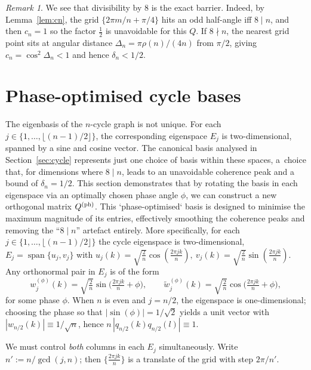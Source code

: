 \documentclass[12pt,fleqn]{amsart}
\theoremstyle{remark}
\newtheorem{rem}[thm]{Remark}
\newcommand{\1}{\mathbf{1}}
\begin{document}
\begin{rem}We see that divisibility by $8$ is the exact barrier. Indeed, by Lemma~\ref{lem:cn}, the grid $\{2\pi m/n+\pi/4\}$ hits an odd half-angle iff $8\mid n$, and then $c_n=1$ so the factor $\tfrac12$ is unavoidable for this $Q$. If $8\nmid n$, the nearest grid point sits at angular distance $\Delta_n=\pi\rho(n)/(4n)$ from $\pi/2$, giving $c_n=\cos^2\Delta_n<1$ and hence $\delta_n<1/2$.
\end{rem}

\section{Phase-optimised cycle bases}

The eigenbasis of the $n$-cycle graph is not unique. For each $j \in \{1, \dots, \lfloor(n-1)/2\rfloor\}$, the corresponding eigenspace $E_j$ is two-dimensional, spanned by a sine and cosine vector. The canonical basis analysed in Section~\ref{sec:cycle} represents just one choice of basis within these spaces, a~choice that, for dimensions where $8 \mid n$, leads to an unavoidable coherence peak and a bound of $\delta_n=1/2$. This section demonstrates that by rotating the basis in each eigenspace via an optimally chosen phase angle $\phi$, we can construct a new orthogonal matrix $Q^{\rm (ph)}$. This `phase-optimised` basis is designed to minimise the maximum magnitude of its entries, effectively smoothing the coherence peaks and removing the ``$8 \mid n$'' artefact entirely. More specifically, for each $j\in\{1,\dots,\lfloor(n-1)/2\rfloor\}$ the cycle eigenspace is two-dimensional,
$E_j=\operatorname{span}\{u_j,v_j\}$ with
\(
u_j(k)=\sqrt{\tfrac2n}\cos(\tfrac{2\pi jk}{n}),
\ v_j(k)=\sqrt{\tfrac2n}\sin(\tfrac{2\pi jk}{n}) .
\)
Any orthonormal pair in $E_j$ is of the form
\[
w^{(\phi)}_j(k)=\sqrt{\tfrac{2}{n}}\sin\!\Big(\tfrac{2\pi jk}{n}+\phi\Big),\qquad
\tilde w^{(\phi)}_j(k)=\sqrt{\tfrac{2}{n}}\cos\!\Big(\tfrac{2\pi jk}{n}+\phi\Big),
\]
for some phase $\phi$. When $n$ is even and $j=n/2$, the eigenspace is one-dimensional; choosing the phase so that $|\sin(\phi)|=1/\sqrt2$ yields a unit vector with $|w_{n/2}(k)|\equiv 1/\sqrt n$, hence $n\,|q_{n/2}(k)q_{n/2}(l)|\equiv 1$.

We must control \emph{both} columns in each $E_j$ simultaneously. Write $n':=n/\gcd(j,n)$; then $\{\tfrac{2\pi jk}{n}\}$ is a translate of the grid with step $2\pi/n'$.
\end{document}
